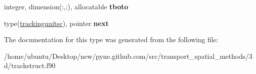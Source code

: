 \begin{DoxyCompactItemize}
\item 
integer, dimension(\+:,\+:), allocatable {\bfseries tboto}\hypertarget{structtracking__data__structures_1_1trackingunitsc_a6b3cceaa9cf6b60ea0330fc48f3ab107}{}\label{structtracking__data__structures_1_1trackingunitsc_a6b3cceaa9cf6b60ea0330fc48f3ab107}

\item 
type(\hyperlink{structtracking__data__structures_1_1trackingunitsc}{trackingunitsc}), pointer {\bfseries next}\hypertarget{structtracking__data__structures_1_1trackingunitsc_ad91a2408f427440a9f4a543bc5923a92}{}\label{structtracking__data__structures_1_1trackingunitsc_ad91a2408f427440a9f4a543bc5923a92}

\end{DoxyCompactItemize}


The documentation for this type was generated from the following file\+:\begin{DoxyCompactItemize}
\item 
/home/ubuntu/\+Desktop/new/pyne.\+github.\+com/src/transport\+\_\+spatial\+\_\+methods/3d/trackstruct.\+f90\end{DoxyCompactItemize}
